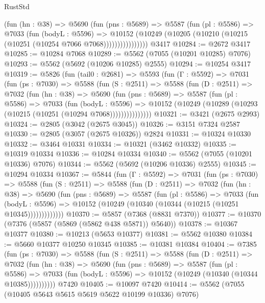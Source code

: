 \begin{lexlean}{RustStd}
\begin{coremodule}
                (fun (hn : @38) =>
                @5690
                  (fun (pns : @5689) =>
                  @5587
                    (fun (pl : @5586) =>
                    @7033
                      (fun (bodyL : @5596) =>
                      @10152
                        (@10249 (@10205 (@10210 (@10215 (@10251 (@10254 @7066 @7068))))))))))))))))
    @3417
@10284 := @2672 @3417
@10285 := @10284 @7068
@10289 := @5562 (@7055 (@10201 @10285) @7076)
@10293 := @5562 (@5692 (@10206 @10285) @2555)
@10294 := @10254 @3417
@10319 := @5826
    (fun (tail0 : @2681) =>
    @5593
      (fun (Γ : @5592) =>
      @7031
        (fun (ps : @7030) =>
        @5588
          (fun (S : @2511) =>
          @5588
            (fun (D : @2511) =>
            @7032
              (fun (hn : @38) =>
              @5690
                (fun (pns : @5689) =>
                @5587
                  (fun (pl : @5586) =>
                  @7033
                    (fun (bodyL : @5596) =>
                    @10152 (@10249 (@10289 (@10293 (@10215 (@10251 (@10294 @7068)))))))))))))))
@10321 := @3421 (@2675 @2993)
@10324 := @2805 (@3042 (@2675 @3045))
@10326 := @3151 @7324 @2587
@10330 := @2805 (@3057 (@2675 @10326)) @2824
@10331 := @10324 @10330
@10332 := @3464 @10331
@10334 := @10321 (@3462 @10332)
@10335 := @10319 @10334
@10336 := @10284 @10334
@10340 := @5562 (@7055 (@10201 @10336) @7076)
@10344 := @5562 (@5692 (@10206 @10336) @2555)
@10345 := @10294 @10334
@10367 := @5844
    (fun (Γ : @5592) =>
    @7031
      (fun (ps : @7030) =>
      @5588
        (fun (S : @2511) =>
        @5588
          (fun (D : @2511) =>
          @7032
            (fun (hn : @38) =>
            @5690
              (fun (pns : @5689) =>
              @5587
                (fun (pl : @5586) =>
                @7033
                  (fun (bodyL : @5596) =>
                  @10152 (@10249 (@10340 (@10344 (@10215 (@10251 @10345)))))))))))))
@10370 := @5857 (@7368 (@8831 @7370))
@10377 := @10370 (@7376 (@5857 (@5869 (@5862 @438 @5871)) @5640))
@10378 := @10367 @10377
@10380 := @10213 (@5653 @10377)
@10381 := @5562 @10380
@10384 := @5660 @10377 @10250 @10345
@10385 := @10381 @10384
@10404 := @7385
    (fun (ps : @7030) =>
    @5588
      (fun (S : @2511) =>
      @5588
        (fun (D : @2511) =>
        @7032
          (fun (hn : @38) =>
          @5690
            (fun (pns : @5689) =>
            @5587
              (fun (pl : @5586) =>
              @7033 (fun (bodyL : @5596) => @10152 (@10249 (@10340 (@10344 @10385))))))))))
    @7420
@10405 := @10097 @7420
@10414 := @5562 (@7055 (@10405 @5643 @5615 @5619 @5622 @10199 @10336) @7076)

\end{coremodule}
\end{lexlean}
